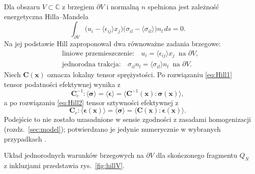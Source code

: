 \documentclass[12pt,a4paper,twoside,openright]{report}
\theoremstyle{definition}
\theoremstyle{remark}
\newcommand{\C}{\mathbb{C}}
\begin{document}
Dla obszaru $V\subset\C$ z brzegiem $\partial V$ i normalną $n$ spełniona jest zależność energetyczna Hilla--Mandela
\begin{equation}\label{eq:HM}
\int_{\partial V}\bigl(u_i-\langle\epsilon_{ij}\rangle x_j\bigr)\bigl(\sigma_{il}-\langle\sigma_{il}\rangle\bigr)n_l\,ds=0 .
\end{equation}
Na jej podstawie Hill \cite{hill1965self} zaproponował dwa równoważne zadania brzegowe:
\begin{align}
&\text{liniowe przemieszczenie:}\quad u_i=\langle\epsilon_{ij}\rangle x_j\ \text{ na }\partial V, \label{eq:Hill1}\\
&\text{jednorodna trakcja:}\quad \sigma_{il}n_l=\langle\sigma_{il}\rangle n_l\ \text{ na }\partial V. \label{eq:Hill2}
\end{align}
Niech $\mathbf C(\mathbf x)$ oznacza lokalny tensor sprężystości. Po rozwiązaniu \eqref{eq:Hill1} tensor podatności efektywnej wynika z
\begin{equation}\label{eq:Hill3}
\mathbf C_e^{-1}:\langle\boldsymbol\sigma\rangle=\langle\boldsymbol\epsilon\rangle=\langle\mathbf C^{-1}(\mathbf x):\boldsymbol\sigma(\mathbf x)\rangle,
\end{equation}
a po rozwiązaniu \eqref{eq:Hill2} tensor sztywności efektywnej z
\begin{equation}\label{eq:Hill4}
\mathbf C_e:\langle\boldsymbol\epsilon(\mathbf x)\rangle=\langle\boldsymbol\sigma\rangle=\langle\mathbf C(\mathbf x):\boldsymbol\epsilon(\mathbf x)\rangle .
\end{equation}
Podejście to nie zostało uzasadnione w sensie zgodności z zasadami homogenizacji (rozdz.~\ref{sec:model}); potwierdzano je jedynie numerycznie w wybranych przypadkach \cite{czapla2025computational}.

Układ jednorodnych warunków brzegowych na $\partial V$ dla skończonego fragmentu $Q_N$ z inkluzjami przedstawia rys.~\ref{fig:hillV}.
\end{document}
